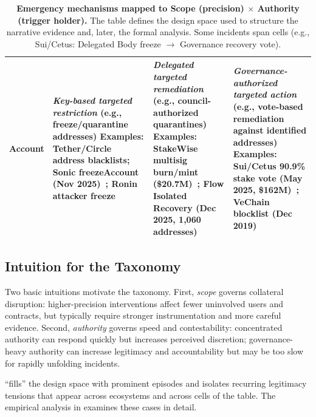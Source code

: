 \documentclass[12pt]{article}
\newif\ifconcise
\begin{document}
\begin{table}[!htbp]
\begin{tabularx}{\linewidth}{
  >{\raggedright\arraybackslash}p{2.0cm}
  >{\raggedright\arraybackslash}X
  >{\raggedright\arraybackslash}X
  >{\raggedright\arraybackslash}X
}
\textbf{Account}
&
\emph{Key-based targeted restriction} \newline
(e.g., freeze/quarantine addresses) \newline
\textbf{Examples:} Tether/Circle address blacklists; Sonic freezeAccount (Nov 2025)~\cite{Sonic2025Freeze}; Ronin attacker freeze~\cite{Ronin2022Exploit}
&
\emph{Delegated targeted remediation} \newline
(e.g., council-authorized quarantines) \newline
\textbf{Examples:} StakeWise multisig burn/mint (\$20.7M)~\cite{StakeWise2025Recovery}; Flow Isolated Recovery (Dec 2025, 1,060 addresses)~\cite{Flow2025Recovery}
&
\emph{Governance-authorized targeted action} \newline
(e.g., vote-based remediation against identified addresses) \newline
\textbf{Examples:} Sui/Cetus 90.9\% stake vote (May 2025, \$162M)~\cite{SuiCetusVote}; VeChain blocklist (Dec 2019)~\cite{VeChain2025Refutation} \\
\bottomrule
\end{tabularx}

\caption{\textbf{Emergency mechanisms mapped to Scope (precision) $\times$ Authority (trigger holder).} The table defines the design space used to structure the narrative evidence and, later, the formal analysis. Some incidents span cells (e.g., Sui/Cetus: Delegated Body freeze $\to$ Governance recovery vote).}
\label{tab:scope-authority}
\end{table}


\ifconcise\else
\subsection{Intuition for the Taxonomy}
\label{sec:taxonomy-why}

Two basic intuitions motivate the taxonomy.
First, \emph{scope} governs collateral disruption: higher-precision interventions affect fewer uninvolved users and contracts,
but typically require stronger instrumentation and more careful evidence.
Second, \emph{authority} governs speed and contestability: concentrated authority can respond quickly 
but increases perceived discretion; governance-heavy authority can increase legitimacy and accountability 
but may be too slow for rapidly unfolding incidents.

 ``fills'' the design space with prominent episodes and isolates recurring legitimacy tensions that appear across ecosystems and across cells of the table. The empirical analysis in  examines these cases in detail.
\end{document}
